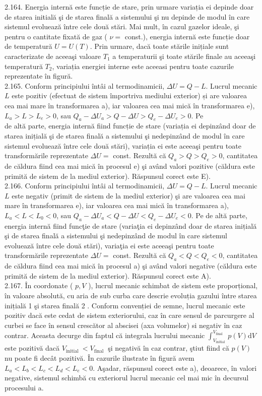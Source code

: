 \documentclass[10pt]{article}
\begin{document}
2.164. Energia internă este funcție de stare, prin urmare variația ei depinde doar de starea initială şi de starea finală a sistemului şi nu depinde de modul în care sistemul evoluează între cele două stări. Mai mult, în cazul gazelor ideale, şi pentru o cantitate fixată de gaz ( $\nu=$ const.), energia internă este funcție doar de temperatură $U=U(T)$. Prin urmare, dacă toate stările inițiale sunt caracterizate de aceeaşi valoare $T_{1}$ a temperaturii şi toate stările finale au aceeaşi temperatură $T_{2}$, variația energiei interne este aceeasi pentru toate cazurile reprezentate în figură.\\
2.165. Conform principiului întâi al termodinamicii, $\Delta U=Q-L$. Lucrul mecanic $L$ este pozitiv (efectuat de sistem împortriva mediului exterior) și are valoarea cea mai mare în transformarea a), iar valoarea cea mai mică în transformarea e), $L_{a}>L>L_{e}>0$, sau $Q_{a}-\Delta U_{a}>Q-\Delta U>Q_{e}-\Delta U_{e}>0$. Pe\\
de altă parte, energia internă fiind funcție de stare (variația ei depinzând doar de starea inițială şi de starea finală a sistemului şi nedepinzând de modul în care sistemul evoluează între cele două stări), variația ei este aceeaşi pentru toate transformările reprezentate $\Delta U=$ const. Rezultă că $Q_{a}>Q>Q_{e}>0$, cantitatea de căldura fiind cea mai mică în procesul e) şi având valori pozitive (căldura este primită de sistem de la mediul exterior). Răspunsul corect este E).\\
2.166. Conform principiului întâi al termodinamicii, $\Delta U=Q-L$. Lucrul mecanic $L$ este negativ (primit de sistem de la mediul exterior) şi are valoarea cea mai mare în transformarea e), iar valoarea cea mai mică în transformarea a), $L_{a}<L<L_{0}<0$, sau $Q_{a}-\Delta U_{a}<Q-\Delta U<Q_{e}-\Delta U_{e}<0$. Pe de altă parte, energia internă fiind funcţie de stare (variaţia ei depinzând doar de starea inițială şi de starea finală a sistemului şi nedepinzând de modul în care sistemul evoluează între cele două stări), variaţia ei este aceeaşi pentru toate transformările reprezentate $\Delta U=$ const. Rezultă că $Q_{a}<Q<Q_{e}<0$, cantitatea de căldura fiind cea mai mică în procesul a) şi având valori negative (căldura este primită de sistem de la mediul exterior). Răspunsul corect este A).\\
2.167. În coordonate ( $p, V$ ), lucrul mecanic schimbat de sistem este proporțional, în valoare absolută, cu aria de sub curba care descrie evoluția gazului între starea inițială 1 şi starea finală 2 . Conform convenției de semne, lucrul mecanic este pozitiv dacă este cedat de sistem exteriorului, caz în care sensul de parcurgere al curbei se face în sensul crescător al abscisei (axa volumelor) si negativ în caz contrar. Aceasta decurge din faptul că integrala lucrului mecanic $\int_{V_{\text {initial }}}^{V_{\text {final }}} p(V) \mathrm{d} V$ este pozitivă dacă $V_{\text {initial }}<V_{\text {final }}$ şi negativă în caz contrar, ştiut fiind că $p(V)$ nu poate fi decât pozitivă. În cazurile ilustrate în figură avem $L_{a}<L_{b}<L_{c}<L_{d}<L_{e}<0$. Aşadar, răspunsul corect este a), deoarece, în valori negative, sistemul schimbă cu exteriorul lucrul mecanic cel mai mic în decursul procesului a.\\
\end{document}

